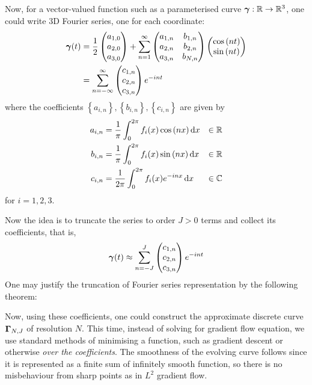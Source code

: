 \documentclass[../dissertation.tex]{subfiles}
\begin{document}
Now, for a vector-valued function such as a parameterised curve $\boldsymbol{\gamma}:\mathbb{R} \rightarrow \mathbb{R}^3$, one could write 3D Fourier series,
one for each coordinate:
\begin{align}
    \mathbf{\boldsymbol{\gamma}} (t) &= \frac{1}{2}
    \begin{pmatrix}
        a_{1,0} \\
        a_{2,0} \\
        a_{3,0}
    \end{pmatrix}
    + \sum_{n=1}^\infty
    \begin{pmatrix}
        a_{1,n} & b_{1,n} \\
        a_{2,n} & b_{2,n} \\
        a_{3,n} & b_{N,n}
    \end{pmatrix}
    \begin{pmatrix}
        \cos {\left( nt \right)} \\
        \sin {\left( nt \right)}
    \end{pmatrix}
    \\
    &= \sum_{n=-\infty}^{\infty}
    \begin{pmatrix}
        c_{1,n} \\
        c_{2,n} \\
        c_{3,n}
    \end{pmatrix}
    e^{-int}
\end{align}
where the coefficients $\left\{ a_{i,n} \right\}, \left\{ b_{i,n} \right\}, \left\{ c_{i,n} \right\}$ are given by
\begin{align}
    a_{i,n} &= \frac{1}{\pi} \int_{0}^{2\pi} f_i (x) \cos {\left( nx \right)} \, \text{d} x & \in \mathbb{R}\\
    b_{i,n} &= \frac{1}{\pi} \int_{0}^{2\pi} f_i (x) \sin {\left( nx \right)} \, \text{d} x & \in \mathbb{R}\\
    c_{i,n} &= \frac{1}{2\pi} \int_{0}^{2\pi} f_i (x) e^{-inx} \, \text{d} x & \in \mathbb{C}
\end{align}
for $i=1, 2, 3$.

Now the idea is to truncate the series to order $J > 0$ terms and collect its coefficients,
that is,
\begin{equation*}
    \boldsymbol{\gamma}(t) \approx \sum_{n=-J}^{J}
    \begin{pmatrix}
        c_{1,n} \\
        c_{2,n} \\
        c_{3,n}
    \end{pmatrix}
    e^{-int}
\end{equation*}
One may justify the truncation of Fourier series representation by the following theorem:
\begin{theorem}
\lipsum[1]
\end{theorem}
Now, using these coefficients, one could construct the approximate discrete curve $\boldsymbol{\Gamma}_{N,J}$ of resolution $N$.
This time, instead of solving for gradient flow equation,
we use standard methods of minimising a function, such as gradient descent or otherwise \textit{over the coefficients}.
The smoothness of the evolving curve follows since it is represented as a finite sum of infinitely smooth function,
so there is no misbehaviour from sharp points as in $L^2$ gradient flow.
\end{document}
